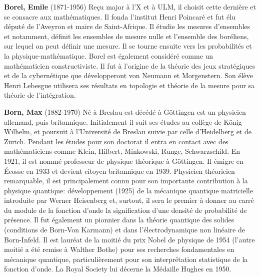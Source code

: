 \textbf{Borel, Emile} (1871-1956) Reçu major à l'X et à ULM, il choisit cette dernière et se consacre aux mathématiques. Il fonda l'institut Henri Poincaré et fut élu député de l'Aveyron et maire de Saint-Afrique. Il étudie les mesures d'ensembles et notamment, définit les ensembles de mesure nulle et l'ensemble des boréliens, sur lequel on peut définir une mesure. Il se tourne ensuite vers les probabilités et la physique-mathématique. Borel est également considéré comme un mathématicien constructiviste. Il fut à l'origine de la théorie des jeux stratégiques et de la cybernétique que développeront von Neumann et Morgenstern. Son élève Henri Lebesgue utilisera ses résultats en topologie et théorie de la mesure pour sa théorie de l'intégration.

\textbf{Born, Max} (1882-1970) Né à Breslau est décédé à Göttingen est un physicien allemand, puis britannique. Initialement il suit ses études au collège de König-Wilhelm, et poursuit à l'Université de Breslau suivie par celle d'Heidelberg et de Zürich. Pendant les études pour son doctorat il entra en contact avec des mathématiciens comme Klein, Hilbert, Minkowski, Runge, Schwarzschild. En 1921, il est nommé professeur de physique théorique à Göttingen. Il émigre en Écosse en 1933 et devient citoyen britannique en 1939. Physicien théoricien remarquable, il est principalement connu pour son importante contribution à la physique quantique: développement (1925) de la mécanique quantique matricielle introduite par Werner Heisenberg et, surtout, il sera le premier à donner au carré du module de la fonction d'onde la signification d'une densité de probabilité de présence. Il fut également un pionnier dans la théorie quantique des solides (conditions de Born-Von Karmann) et dans l'électrodynamique non linéaire de Born-Infeld. Il est lauréat de la moitié du prix Nobel de physique de 1954 (l'autre moitié a été remise à Walther Bothe) pour ses recherches fondamentales en mécanique quantique, particulièrement pour son interprétation statistique de la fonction d'onde. La Royal Society lui décerne la Médaille Hughes en 1950.


